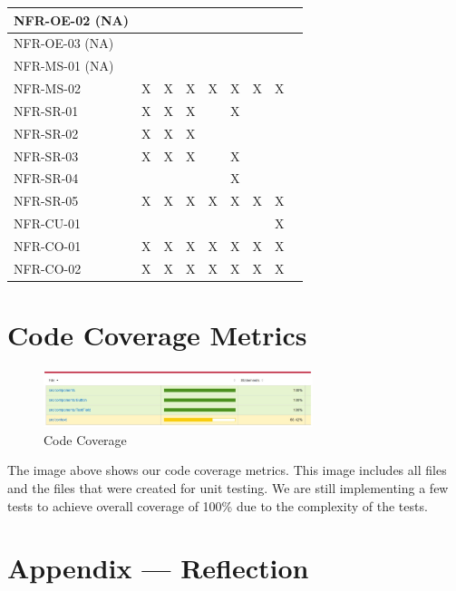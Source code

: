 \documentclass[12pt, titlepage]{article}
\begin{document}
\begin{longtable}{|p{3.5cm}|p{1cm}|p{1cm}|p{1cm}|p{1cm}|p{1cm}|p{1cm}|p{1cm}|p{1cm}}
    NFR-OE-02  (NA) &  &  &  &  &  &  &  \\\hline
    NFR-OE-03  (NA) &  &  &  &  &  &  &  \\\hline
    NFR-MS-01 (NA) &  &  &  &  &  &  &  \\\hline
    NFR-MS-02  & X & X & X & X & X & X & X \\\hline
    NFR-SR-01  & X & X & X &  & X &  &  \\\hline
    NFR-SR-02  & X & X & X &  &  &  &  \\\hline
    NFR-SR-03  & X & X & X &  & X &  &  \\\hline
    NFR-SR-04  &  &  &  &  & X &  &  \\\hline
    NFR-SR-05  & X & X & X & X & X & X & X \\\hline
    NFR-CU-01  &  &  &  &  &  &  & X \\\hline
    NFR-CO-01  & X & X & X & X & X & X & X \\\hline
    NFR-CO-02  & X & X & X & X & X & X & X \\\hline
    
    \hline
\end{longtable}

\section{Code Coverage Metrics}

\begin{figure}[h]
  \centering
  \includegraphics[width=0.7\textwidth]{cc.jpg}
  \caption{Code Coverage}
  \label{FigUH}
  \end{figure}

The image above shows our code coverage metrics. This image includes all files and the files that were created for unit testing. We are still implementing a few tests to achieve overall coverage of 100\% due to the complexity of the tests.




\newpage{}
\section*{Appendix --- Reflection}
\end{document}
